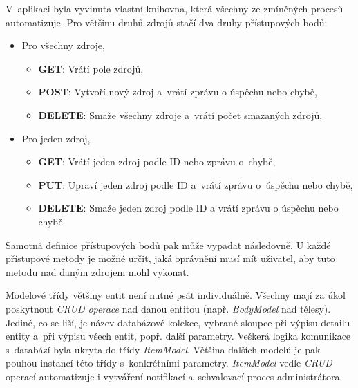 \documentclass[a4paper,12pt]{article}
\begin{document}
V~aplikaci byla vyvinuta vlastní knihovna, která všechny ze zmíněných procesů automatizuje. Pro většinu druhů zdrojů stačí dva druhy přístupových bodů:

\begin{itemize}
\item Pro všechny zdroje,

\begin{itemize}
\item \textbf{GET}: Vrátí pole zdrojů,
\item \textbf{POST}: Vytvoří nový zdroj a~vrátí zprávu o úspěchu nebo chybě,
\item \textbf{DELETE}: Smaže všechny zdroje a~vrátí počet smazaných zdrojů,
\end{itemize}

\item Pro jeden zdroj,

\begin{itemize}
\item \textbf{GET}: Vrátí jeden zdroj podle ID nebo zprávu o~chybě,
\item \textbf{PUT}: Upraví jeden zdroj podle ID a~vrátí zprávu o~úspěchu nebo chybě,
\item \textbf{DELETE}: Smaže jeden zdroj podle ID a vrátí zprávu o úspěchu nebo chybě.
\end{itemize}

\end{itemize}

Samotná definice přístupových bodů pak může vypadat následovně. U každé přístupové metody je možné určit, jaká oprávnění musí mít uživatel, aby tuto metodu nad daným zdrojem mohl vykonat.



Modelové třídy většiny entit není nutné psát individuálně. Všechny mají za úkol poskytnout \textit{CRUD operace} nad danou entitou (např. \textit{BodyModel} nad tělesy). Jediné, co se liší, je název databázové kolekce, vybrané sloupce při výpisu detailu entity a~při výpisu všech entit, popř. další parametry. Veškerá logika komunikace s~databází byla ukryta do třídy \textit{ItemModel}. Většina dalších modelů je pak pouhou instancí této třídy s~konkrétními parametry. \textit{ItemModel} vedle \textit{CRUD} operací automatizuje i vytváření notifikací a~schvalovací proces administrátora.


\end{document}
